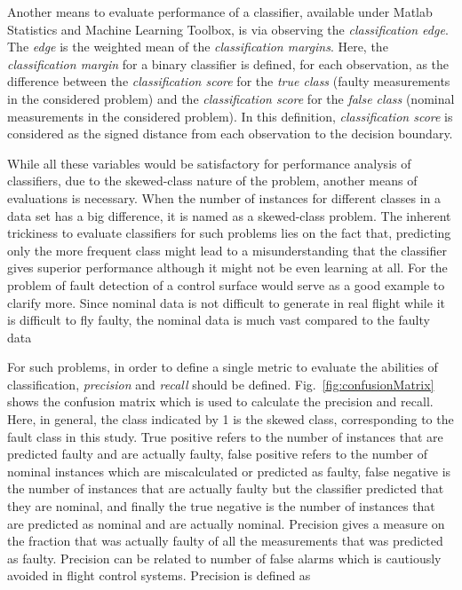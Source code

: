 Another means to evaluate performance of a classifier, available under Matlab Statistics and Machine Learning Toolbox, is via observing the \emph{classification edge}. 
The \emph{edge} is the weighted mean of the \emph{classification margins}. 
Here, the \emph{classification margin} for a binary classifier is defined, for each observation, as the difference between the \emph{classification score} for the \emph{true class} (faulty measurements in the considered problem) and the \emph{classification score} for the \emph{false class} (nominal measurements in the considered problem). 
In this definition, \emph{classification score} is considered as the signed distance from each observation to the decision boundary.

While all these variables would be satisfactory for performance analysis of classifiers, due to the skewed-class nature of the problem, another means of evaluations is necessary.
When the number of instances for different classes in a data set has a big difference, it is named as a skewed-class problem. 
The inherent trickiness to evaluate classifiers for such problems lies on the fact that, predicting only the more frequent class might lead to a misunderstanding that the classifier gives superior performance although it might not be even learning at all. 
For the problem of fault detection of a control surface would serve as a good example to clarify more. 
Since nominal data is not difficult to generate in real flight while it is difficult to fly faulty, the nominal data is much vast compared to the faulty data 

For such problems, in order to define a single metric to evaluate the abilities of classification, \emph{precision} and \emph{recall} should be defined.   
Fig.~\ref{fig:confusionMatrix} shows the confusion matrix which is used to calculate the precision and recall. 
Here, in general, the class indicated by 1 is the skewed class, corresponding to the fault class in this study. 
True positive refers to the number of instances that are predicted faulty and are actually faulty, false positive refers to the number of nominal instances which are miscalculated or predicted as faulty, false negative is the number of instances that are actually faulty but the classifier predicted that they are nominal, and finally the true negative is the number of instances that are predicted as nominal and are actually nominal.
Precision gives a measure on the fraction that was actually faulty of all the measurements that was predicted as faulty. 
Precision can be related to number of false alarms which is cautiously avoided in flight control systems. Precision is defined as 

